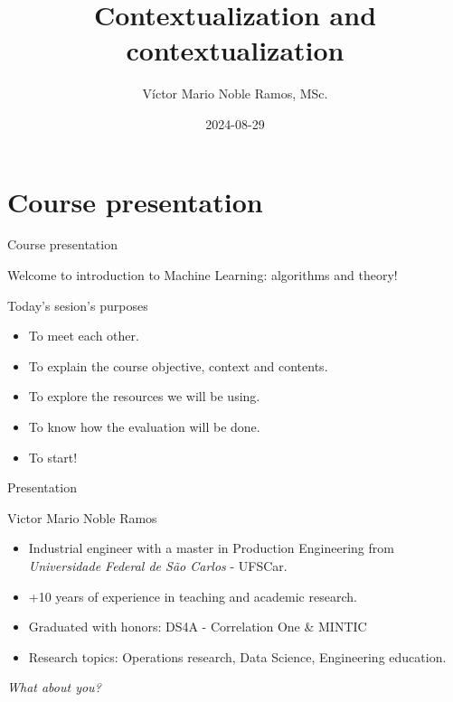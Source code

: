 \documentclass[
  ignorenonframetext,
]{beamer}
\title{Contextualization and contextualization}
\author{Víctor Mario Noble Ramos, MSc.}
\date{2024-08-29}
\providecommand{\tightlist}{%
  \setlength{\itemsep}{0pt}\setlength{\parskip}{0pt}}\usepackage{longtable,booktabs,array}
\begin{document}
\frame{\titlepage}
\ifdefined\Shaded\renewenvironment{Shaded}{\begin{tcolorbox}[sharp corners, breakable, enhanced, boxrule=0pt, interior hidden, frame hidden, borderline west={3pt}{0pt}{shadecolor}]}{\end{tcolorbox}}\fi

\hypertarget{course-presentation}{%
\section{Course presentation}\label{course-presentation}}

\begin{frame}{Course presentation}
\protect\hypertarget{course-presentation-1}{}
\begin{block}{Welcome to introduction to Machine Learning: algorithms
and theory!}
\protect\hypertarget{welcome-to-introduction-to-machine-learning-algorithms-and-theory}{}
\end{block}

\begin{alertblock}{Today's sesion's purposes}
\protect\hypertarget{todays-sesions-purposes}{}
\begin{itemize}[<+->]
\tightlist
\item
  To meet each other.
\item
  To explain the course objective, context and contents.
\item
  To explore the resources we will be using.
\item
  To know how the evaluation will be done.
\item
  To start!
\end{itemize}
\end{alertblock}
\end{frame}

\begin{frame}{Presentation}
\protect\hypertarget{presentation}{}
\begin{exampleblock}{Victor Mario Noble Ramos}
\protect\hypertarget{victor-mario-noble-ramos}{}
\begin{itemize}
\tightlist
\item
  Industrial engineer with a master in Production Engineering from
  \emph{Universidade Federal de São Carlos} - UFSCar.
\item
  +10 years of experience in teaching and academic research.
\item
  Graduated with honors: DS4A - Correlation One \& MINTIC
\item
  Research topics: Operations research, Data Science, Engineering
  education.
\end{itemize}

\pause
\end{exampleblock}

\begin{block}{}
\protect\hypertarget{section}{}
\emph{What about you?}
\end{block}
\end{frame}
\end{document}
